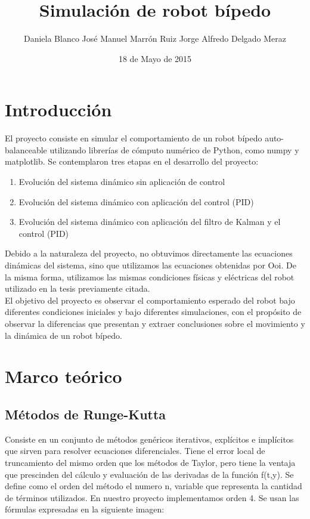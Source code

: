 \documentclass[10pt]{article}
\title{Simulación de robot bípedo}
\date{18 de Mayo de 2015}
\author{
	Daniela Blanco
	José Manuel Marrón Ruiz
	Jorge Alfredo Delgado Meraz
}
\begin{document}
\maketitle
\section{Introducción}
El proyecto consiste en simular el comportamiento de un robot bípedo auto-balanceable utilizando librerías de cómputo numérico de Python, como numpy y matplotlib. Se contemplaron tres etapas en el desarrollo del proyecto:
\begin{enumerate}
\item Evolución del sistema dinámico sin aplicación de control
\item Evolución del sistema dinámico con aplicación del control (PID)
\item Evolución del sistema dinámico con aplicación del filtro de Kalman y el control (PID)
\end{enumerate}
Debido a la naturaleza del proyecto, no obtuvimos directamente las ecuaciones dinámicas del sistema, sino que utilizamos las ecuaciones obtenidas por Ooi\cite{ooi03}. De la misma forma, utilizamos las mismas condiciones físicas y eléctricas del robot utilizado en la tesis previamente citada.\\
El objetivo del proyecto es observar el comportamiento esperado del robot bajo diferentes condiciones iniciales y bajo diferentes simulaciones, con el propósito de observar la diferencias que presentan y extraer conclusiones sobre el movimiento y la dinámica de un robot bípedo. 
\section{Marco teórico}
\subsection{Métodos de Runge-Kutta}
Consiste en un conjunto de métodos genéricos iterativos, explícitos e implícitos que sirven para resolver ecuaciones diferenciales. Tiene el error local de truncamiento del mismo orden que los métodos de Taylor, pero tiene la ventaja que prescinden del cálculo y evaluación de las derivadas de la función f(t,y). Se define como el orden del método el numero n, variable que representa la cantidad de términos utilizados. En nuestro proyecto implementamos orden 4. Se usan las fórmulas expresadas en la siguiente imagen:
\begin{center}
\end{center}
\end{document}
